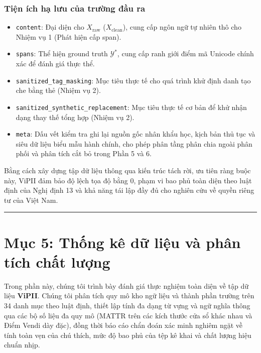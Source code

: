 \documentclass[
  11pt,
  a4paper,
]{article}
\providecommand{\tightlist}{%
  \setlength{\itemsep}{0pt}\setlength{\parskip}{0pt}}
\begin{document}
\subsubsection{Tiện ích hạ lưu của trường đầu
ra}\label{tiux1ec7n-uxedch-hux1ea1-lux1b0u-cux1ee7a-trux1b0ux1eddng-ux111ux1ea7u-ra}

\begin{itemize}
\tightlist
\item
  \texttt{content}: Đại diện cho \(X_{\text{raw}}\)
  (\(X_{\text{clean}}\)), cung cấp ngôn ngữ tự nhiên thô cho Nhiệm vụ 1
  (Phát hiện cấp span).
\item
  \texttt{spans}: Thể hiện ground truth \(\mathcal{Y}^*\), cung cấp ranh
  giới điểm mã Unicode chính xác để đánh giá thực thể.
\item
  \texttt{sanitized\_tag\_masking}: Mục tiêu thực tế cho quá trình khử
  định danh tạo che bằng thẻ (Nhiệm vụ 2).
\item
  \texttt{sanitized\_synthetic\_replacement}: Mục tiêu thực tế cơ bản để
  khử nhận dạng thay thế tổng hợp (Nhiệm vụ 2).
\item
  \texttt{meta}: Dấu vết kiểm tra ghi lại nguồn gốc nhân khẩu học, kịch
  bản thủ tục và siêu dữ liệu biểu mẫu hành chính, cho phép phân tầng
  phân chia ngoài phân phối và phân tích cắt bỏ trong Phần 5 và 6.
\end{itemize}

Bằng cách xây dựng tập dữ liệu thông qua kiến
\hspace{0pt}\hspace{0pt}trúc tách rời, ưu tiên ràng buộc này, ViPII đảm
bảo độ lệch tọa độ bằng 0, phạm vi bao phủ toàn diện theo luật định của
Nghị định 13 và khả năng tái lập đầy đủ cho nghiên cứu về quyền riêng tư
của Việt Nam.

\begin{center}\rule{0.5\linewidth}{0.5pt}\end{center}

\section{Mục 5: Thống kê dữ liệu và phân tích chất
lượng}\label{mux1ee5c-5-thux1ed1ng-kuxea-dux1eef-liux1ec7u-vuxe0-phuxe2n-tuxedch-chux1ea5t-lux1b0ux1ee3ng}

Trong phần này, chúng tôi trình bày đánh giá thực nghiệm toàn diện về
tập dữ liệu \textbf{ViPII}. Chúng tôi phân tích quy mô kho ngữ liệu và
thành phần trường trên 34 danh mục theo luật định, thiết lập tính đa
dạng từ vựng và ngữ nghĩa thông qua các bộ số liệu đa quy mô (MATTR trên
các kích thước cửa sổ khác nhau và Điểm Vendi dày đặc), đồng thời báo
cáo chẩn đoán xác minh nghiêm ngặt về tính toàn vẹn của chú thích, mức
độ bao phủ của tệp kê khai và chất lượng hiệu chuẩn nhịp.
\end{document}
